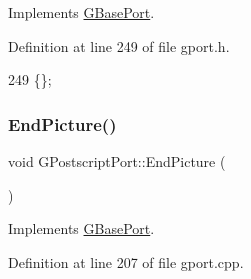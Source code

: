 Implements \mbox{\hyperlink{class_g_base_port_aa5b444d85d6bf8c88bbddb58f7ce8bd4}{G\+Base\+Port}}.



Definition at line 249 of file gport.\+h.


\begin{DoxyCode}
249 \{\};
\end{DoxyCode}
\mbox{\label{class_g_postscript_port_afae4057295ef049fac22ce97eecb7d7f}} 
\subsubsection{\texorpdfstring{End\+Picture()}{EndPicture()}}
{\footnotesize\ttfamily void G\+Postscript\+Port\+::\+End\+Picture (\begin{DoxyParamCaption}{ }\end{DoxyParamCaption})\hspace{0.3cm}{\ttfamily [virtual]}}



Implements \mbox{\hyperlink{class_g_base_port_ac14e5cf72682662f8ac24c57e98b1bfa}{G\+Base\+Port}}.



Definition at line 207 of file gport.\+cpp.


